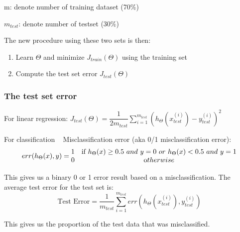 \documentclass{article}
\begin{document}
m: denote number of training dataset (70\%)

$m_{test}$: denote number of testset (30\%)

\noindent The new procedure using these two sets is then:

\begin{enumerate}
	\item Learn $\Theta$ and minimize $J_{train}(\Theta)$ using the training set
	\item Compute the test set error $J_{test}(\Theta)$
\end{enumerate}

\subsubsection{The test set error}
For linear regression: $J_{test}(\Theta) = \dfrac{1}{2m_{test}} \sum_{i=1}^{m_{test}}(h_\Theta(x^{(i)}_{test}) - y^{(i)}_{test})^2$

For classification ~ Misclassification error (aka 0/1 misclassification error):
$$err(h_\Theta(x),y) = \begin{matrix} 1 & \mbox{if } h_\Theta(x) \geq 0.5\ and\ y = 0\ or\ h_\Theta(x) < 0.5\ and\ y = 1\\ 0 & \mbox otherwise \end{matrix}$$

This gives us a binary 0 or 1 error result based on a misclassification. The average test error for the test set is:
$$\text{Test Error} = \dfrac{1}{m_{test}} \sum^{m_{test}}_{i=1} err(h_\Theta(x^{(i)}_{test}), y^{(i)}_{test})$$

This gives us the proportion of the test data that was misclassified.
\end{document}
